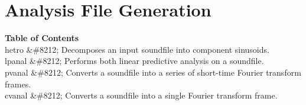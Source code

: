 \begin{comment}
\documentclass[10pt]{article}
\usepackage{fullpage, graphicx, url}
\setlength{\parskip}{1ex}
\setlength{\parindent}{0ex}
\title{Analysis File Generation}



\begin{tabular}{ccc}
The Alternative Csound Reference Manual & & \\
Previous &The Utility Programs &Next

\end{tabular}

\end{comment}
\section{Analysis File Generation}
\begin{description}
\item[\textbf{Table of Contents}
]\item[hetro \&\#8212; Decomposes an input soundfile into component sinusoids. ]\item[lpanal \&\#8212; Performs both linear predictive analysis on a soundfile. ]\item[pvanal \&\#8212; Converts a soundfile into a series of short-time Fourier transform frames. ]\item[cvanal \&\#8212; Converts a soundfile into a single Fourier transform frame. ]
\end{description}


\begin{comment}
\begin{tabular}{lcr}
Previous &Home &Next \\
Credits &Up &hetro

\end{tabular}



\end{comment}
